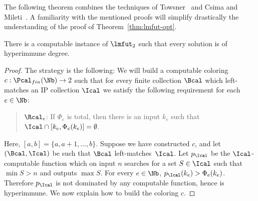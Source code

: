 The following theorem combines the techniques of Towsner~\cite[Theorem 3.8]{Towsner2012simple} and Csima and Mileti~\cite[Theorem 4.1]{Csima2009strength}. A familiarity with the mentioned proofs will simplify drastically the understanding of the proof of Theorem~\ref{thm:lmfut-opt}.



\begin{theorem}\label{thm:lmfut-opt}
There is a computable instance of $\lmfut_2$ such 
that every solution is of hyperimmune degree.
\end{theorem}
\begin{proof}
The strategy is the following: We will build a computable coloring $c : \Pcal_{fin}(\Nb) \to 2$ such that for every finite collection $\Bcal$ which left-matches an IP collection $\Ical$ we satisfy the following requirement for each $e \in \Nb$:
\begin{quote}
$\Rcal_e$: If $\Phi_e$ is total, then
there is an input $k_e$ such that 
$\Ical \cap [k_e, \Phi_e(k_e)] = \emptyset$.
\end{quote}
Here, $[a, b] = \{a, a+1, \dots, b \}$.
Suppose we have constructed $c$, and let $(\Bcal, \Ical)$ be such that $\Bcal$ left-matches~$\Ical$.
Let $p_\Ical$ be the $\Ical$-computable function which on input
$n$ searches for a set $S \in \Ical$ such that $\min S > n$ and outputs $\max S$. For every $e \in \Nb$, $p_\Ical(k_e) > \Phi_e(k_e)$.
Therefore $p_\Ical$ is not dominated by any computable function, hence is hyperimmune. We now explain how to build the coloring $c$.


\end{proof}
